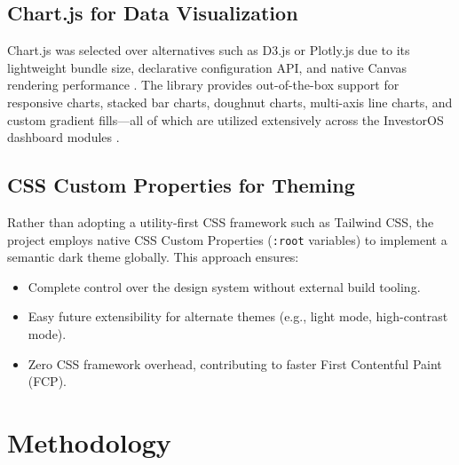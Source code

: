\documentclass{book}
\begin{document}
\section{Chart.js for Data Visualization}
Chart.js was selected over alternatives such as D3.js \cite{bostock2011d3} or Plotly.js due to its lightweight bundle size, declarative configuration API, and native Canvas rendering performance \cite{w3ccanvas2024}. The library provides out-of-the-box support for responsive charts, stacked bar charts, doughnut charts, multi-axis line charts, and custom gradient fills---all of which are utilized extensively across the InvestorOS dashboard modules \cite{chartjs2024}.

\section{CSS Custom Properties for Theming}
Rather than adopting a utility-first CSS framework such as Tailwind CSS, the project employs native CSS Custom Properties (\texttt{:root} variables) \cite{w3ccssprop2024} to implement a semantic dark theme globally. This approach ensures:
\begin{itemize}
    \item Complete control over the design system without external build tooling.
    \item Easy future extensibility for alternate themes (e.g., light mode, high-contrast mode).
    \item Zero CSS framework overhead, contributing to faster First Contentful Paint (FCP).
\end{itemize}

\chapter{Methodology}
\end{document}
